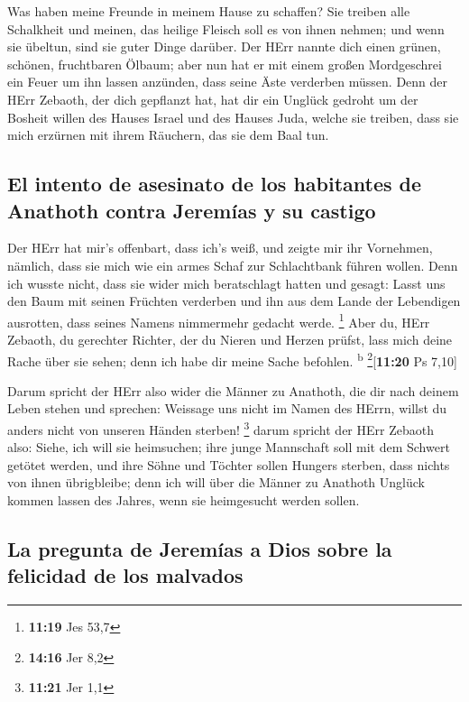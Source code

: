  Was haben meine Freunde in meinem Hause zu schaffen? Sie
treiben alle Schalkheit und meinen, das heilige Fleisch soll es von
ihnen nehmen; und wenn sie übeltun, sind sie guter Dinge darüber.
 Der HErr nannte dich einen grünen, schönen, fruchtbaren
Ölbaum; aber nun hat er mit einem großen Mordgeschrei ein Feuer um ihn
lassen anzünden, dass seine Äste verderben müssen.  Denn
der HErr Zebaoth, der dich gepflanzt hat, hat dir ein Unglück gedroht um
der Bosheit willen des Hauses Israel und des Hauses Juda, welche sie
treiben, dass sie mich erzürnen mit ihrem Räuchern, das sie dem Baal
tun.

\hypertarget{el-intento-de-asesinato-de-los-habitantes-de-anathoth-contra-jeremuxedas-y-su-castigo}{%
\subsection{El intento de asesinato de los habitantes de Anathoth contra
Jeremías y su
castigo}\label{el-intento-de-asesinato-de-los-habitantes-de-anathoth-contra-jeremuxedas-y-su-castigo}}

 Der HErr hat mir's offenbart, dass ich's weiß, und
zeigte mir ihr Vornehmen,  nämlich, dass sie mich wie ein
armes Schaf zur Schlachtbank führen wollen. Denn ich wusste nicht, dass
sie wider mich beratschlagt hatten und gesagt: Lasst uns den Baum mit
seinen Früchten verderben und ihn aus dem Lande der Lebendigen
ausrotten, dass seines Namens nimmermehr gedacht werde. \footnote{\textbf{11:19}
  Jes 53,7}  Aber du, HErr Zebaoth, du gerechter Richter,
der du Nieren und Herzen prüfst, lass mich deine Rache über sie sehen;
denn ich habe dir meine Sache befohlen. \textsuperscript{b}
\footnote{\textbf{14:16} Jer 8,2}{[}\textbf{11:20} Ps 7,10{]}

 Darum spricht der HErr also wider die Männer zu
Anathoth, die dir nach deinem Leben stehen und sprechen: Weissage uns
nicht im Namen des HErrn, willst du anders nicht von unseren Händen
sterben! \footnote{\textbf{11:21} Jer 1,1}  darum spricht
der HErr Zebaoth also: Siehe, ich will sie heimsuchen; ihre junge
Mannschaft soll mit dem Schwert getötet werden, und ihre Söhne und
Töchter sollen Hungers sterben, dass nichts von ihnen übrigbleibe;
 denn ich will über die Männer zu Anathoth Unglück kommen
lassen des Jahres, wenn sie heimgesucht werden sollen.

\hypertarget{la-pregunta-de-jeremuxedas-a-dios-sobre-la-felicidad-de-los-malvados}{%
\subsection{La pregunta de Jeremías a Dios sobre la felicidad de los
malvados}\label{la-pregunta-de-jeremuxedas-a-dios-sobre-la-felicidad-de-los-malvados}}

